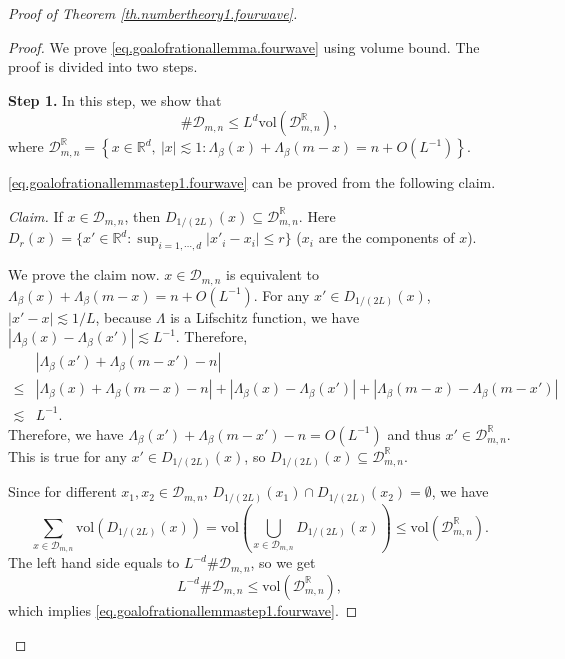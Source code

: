\begin{proof}[Proof of Theorem \ref{th.numbertheory1.fourwave}]
\begin{proof}
We prove \eqref{eq.goalofrationallemma.fourwave} using volume bound. The proof is divided into two steps.

\textbf{Step 1.} In this step, we show that 
\begin{equation}\label{eq.goalofrationallemmastep1.fourwave}
    \#\mathcal{D}_{m,n}\le L^{d} \text{vol}(\mathcal{D}^{\mathbb{R}}_{m,n}),
\end{equation}
where $\mathcal{D}^{\mathbb{R}}_{m,n}=\left\{x\in \mathbb{R}^d,\ |x|\lesssim 1:\Lambda_{\beta}(x)+\Lambda_{\beta}(m-x)=n+O(L^{-1})\right\}$.

\eqref{eq.goalofrationallemmastep1.fourwave} can be proved from the following claim.

\textit{Claim.} If $x\in \mathcal{D}_{m,n}$, then $D_{1/(2L)}(x)\subseteq \mathcal{D}^{\mathbb{R}}_{m,n}$. Here  $D_{r}(x)=\{x'\in \mathbb{R}^d: \sup_{i=1,\cdots, d} |x'_i-x_i|\le r\}$ ($x_i$ are the components of $x$). 

We prove the claim now. $x\in \mathcal{D}_{m,n}$ is equivalent to $\Lambda_{\beta}(x)+\Lambda_{\beta}(m-x)=n+O(L^{-1})$. For any $x'\in D_{1/(2L)}(x)$, $|x'-x|\lesssim 1/L$, because $\Lambda$ is a Lifschitz function, we have $|\Lambda_{\beta}(x)-\Lambda_{\beta}(x')|\lesssim L^{-1}$. Therefore, 
\begin{equation}
\begin{split}
    &|\Lambda_{\beta}(x')+\Lambda_{\beta}(m-x')-n|
    \\
    \le &|\Lambda_{\beta}(x)+\Lambda_{\beta}(m-x)-n|+|\Lambda_{\beta}(x)-\Lambda_{\beta}(x')|+|\Lambda_{\beta}(m-x)-\Lambda_{\beta}(m-x')|
    \\
    \lesssim & L^{-1}.
\end{split}
\end{equation}
Therefore, we have $\Lambda_{\beta}(x')+\Lambda_{\beta}(m-x')-n=O(L^{-1})$ and thus $x'\in \mathcal{D}^{\mathbb{R}}_{m,n}$. This is true for any $x'\in D_{1/(2L)}(x)$, so $D_{1/(2L)}(x)\subseteq \mathcal{D}^{\mathbb{R}}_{m,n}$.

Since for different $x_1,x_2\in \mathcal{D}_{m,n}$, $D_{1/(2L)}(x_1)\cap D_{1/(2L)}(x_2)=\emptyset$, we have 
\begin{equation}
    \sum_{x\in \mathcal{D}_{m,n}} \text{vol}( D_{1/(2L)}(x))=\text{vol}\left( \bigcup_{x\in \mathcal{D}_{m,n}} D_{1/(2L)}(x)\right)\le \text{vol}(\mathcal{D}^{\mathbb{R}}_{m,n}).
\end{equation}
The left hand side equals to $L^{-d}\#\mathcal{D}_{m,n}$, so we get
\begin{equation}
    L^{-d}\#\mathcal{D}_{m,n}\le \text{vol}(\mathcal{D}^{\mathbb{R}}_{m,n}),
\end{equation}
which implies \eqref{eq.goalofrationallemmastep1.fourwave}.


\end{proof}
\end{proof}

